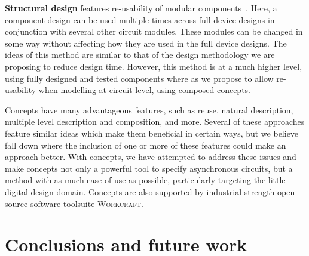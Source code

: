 \documentclass[british, journal]{IEEEtran}
\newcommand{\noun}[1]{\textsc{#1}}
\begin{document}
\textbf{Structural design} features re-usability of modular components~\cite{modular-circuit-design}.
Here, a component design can be used multiple times across full device
designs in conjunction with several other circuit modules. These modules
can be changed in some way without affecting how they are used in
the full device designs. The ideas of this method are similar to that
of the design methodology we are proposing to reduce design time.
However, this method is at a much higher level, using fully designed
and tested components where as we propose to allow re-usability when
modelling at circuit level, using composed concepts.

Concepts have many advantageous features, such as reuse, natural description, multiple level description and composition, and more.
Several of these approaches feature similar ideas which make them beneficial in certain ways,
but we believe fall down where the inclusion of one or more of these features could make an approach better. With concepts,
we have attempted to address these issues and make concepts not only a powerful tool to specify asynchronous circuits, but a method with as much ease-of-use as possible, particularly targeting the little-digital design domain.
Concepts are also supported by industrial-strength open-source software
toolsuite \noun{Workcraft}.


\section{Conclusions and future work\label{sec:conclusions}}
\end{document}
